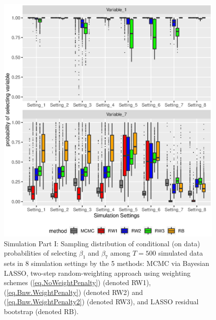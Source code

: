 \documentclass[ejs,authoryear,linksfromyear]{imsart}
\numberwithin{equation}{section}
\theoremstyle{plain}
\begin{document}
\begin{figure}[!]
	\centering
	\includegraphics[scale=0.7]{simul1_prob_select}
	\caption{Simulation Part I: Sampling distribution of conditional (on data) probabilities of selecting $\beta_1$ and $\beta_7$ among $T = 500$ simulated data sets in 8 simulation settings by the 5 methods: MCMC via Bayesian LASSO, two-step random-weighting approach using weighting schemes (\ref{eq.NoWeightPenalty}) (denoted RW1), (\ref{eq.Bnw.WeightPenalty}) (denoted RW2) and (\ref{eq.Bnw.WeightPenalty2}) (denoted RW3), and LASSO residual bootstrap (denoted RB).}
	\label{fig:simul1_prob_select}
\end{figure}  
\end{document}
